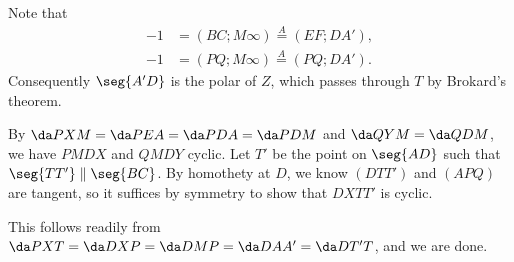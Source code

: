 Note that
\begin{align*}
    -1&=(BC;M\infty)\stackrel A=(EF;DA'),\\
    -1&=(PQ;M\infty)\stackrel A=(PQ;DA').
\end{align*}
Consequently $\seg{A'D}$ is the polar of $Z$, which passes through $T$ by Brokard's theorem.

By $\da PXM=\da PEA=\da PDA=\da PDM$ and $\da QYM=\da QDM$, we have $PMDX$ and $QMDY$ cyclic. Let $T'$ be the point on $\seg{AD}$ such that $\seg{TT'}\parallel\seg{BC}$. By homothety at $D$, we know $(DTT')$ and $(APQ)$ are tangent, so it suffices by symmetry to show that $DXTT'$ is cyclic.

This follows readily from $\da PXT=\da DXP=\da DMP=\da DAA'=\da DT'T$, and we are done.

